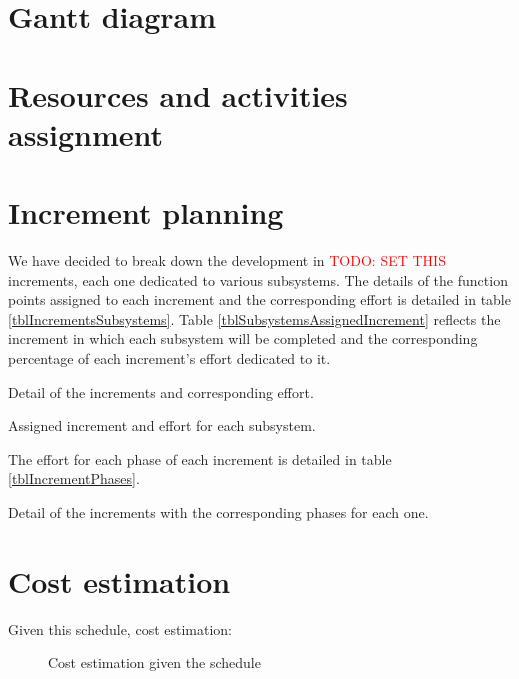 

\section{Gantt diagram}

\section{Resources and activities assignment}

\section{Increment planning}

We have decided to break down the development in \textcolor{red}{TODO: SET THIS} increments, each one dedicated to various subsystems. The details of the function points assigned to each increment and the corresponding effort is detailed in table \ref{tblIncrementsSubsystems}. Table \ref{tblSubsystemsAssignedIncrement} reflects the increment in which each subsystem will be completed and the corresponding percentage of each increment's effort dedicated to it.

\begin{table}[hbtp]
\centering

\caption{Detail of the increments and corresponding effort.}
\label{tblIncrementsSubsystems}
\end{table}

\begin{table}[hbtp]
\centering

\caption{Assigned increment and effort for each subsystem.}
\label{tblSubsystemsAssignedIncrement}
\end{table}

The effort for each phase of each increment is detailed in table \ref{tblIncrementPhases}.

\begin{table}[hbtp]
\centering

\caption{Detail of the increments with the corresponding phases for each one.}
\label{tblIncrementPhases}
\end{table}

\section{Cost estimation}

Given this schedule, cost estimation:

\begin{figure}[hbtp]
\centering

\caption{Cost estimation given the schedule}
\label{tblCostResourceEstimate}
\end{figure}
